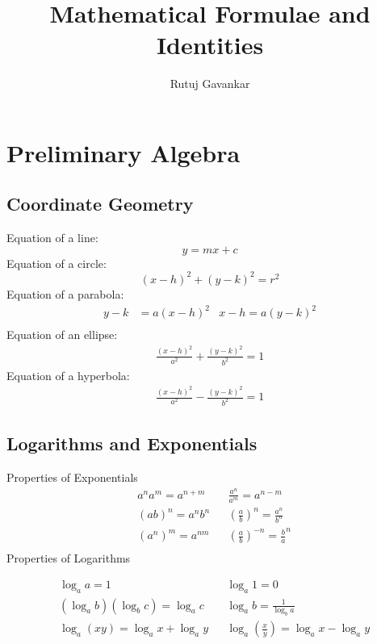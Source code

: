 \documentclass[12pt]{article}
\title{Mathematical Formulae and Identities}
\author{Rutuj Gavankar \\ \email}
\begin{document}
	
	
\maketitle
\tableofcontents
\newpage

\section{Preliminary Algebra}

\subsection{Coordinate Geometry}
Equation of a line:
$$y = mx + c$$
Equation of a circle:
$${(x-h)}^2 + {(y-k)}^2 = r^2$$
Equation of a parabola:
\begin{align*}
y - k &= a{(x-h)}^2 & x-h = a{(y-k)^2} \\
\end{align*}
Equation of an ellipse:
\begin{align*}
\frac{{(x-h)}^2}{a^2} + \frac{{(y-k)}^2}{b^2} = 1 
\end{align*}
Equation of a hyperbola:
\begin{align*}
\frac{{(x-h)}^2}{a^2} - \frac{{(y-k)}^2}{b^2} = 1 
\end{align*}


\subsection{Logarithms and Exponentials}
Properties of Exponentials
\begin{align*} 
		&a^n a^m = a^{n+m} & &\frac{a^n}{a^m}   = a^{n-m}\\
		&(a b)^n = a^n  b^n & &\left({\frac{a}{b}}\right)^n  = \frac{a^n}{b^n}\\
		&(a^n)^m = a^{n m} & &\left({\frac{a}{b}}\right)^{-n} = {\frac{b}{a}}^{n}\\
\end{align*}
Properties of Logarithms


\begin{align*}
&\log_aa  = 1 &   &\log_a1 = 0 \\  
&(\log_ab)(\log_bc) = \log_ac & &\log_ab = \frac{1}{\log_ba} \\ 
&\log_a(xy) = \log_ax + \log_ay &
&\log_a\left(\frac{x}{y}\right) = \log_ax - \log_ay
\end{align*}
\end{document}
